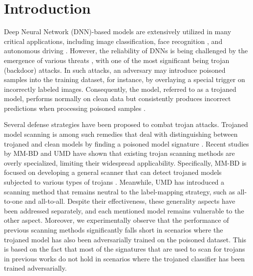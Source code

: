 \section{Introduction}
Deep Neural Network (DNN)-based models are extensively utilized in many critical applications, including image classification, face recognition \cite{face}, and autonomous driving \cite{cars}. However, the reliability of DNNs is being challenged by the emergence of various threats \cite{miller1981inverse}, with one of the most significant being trojan (backdoor) attacks. In such attacks, an adversary may introduce poisoned samples into the training dataset, for instance, by overlaying a special trigger on incorrectly labeled images. Consequently, the model, referred to as a trojaned model, performs normally on clean data but consistently produces incorrect predictions when processing poisoned samples \cite{badnets, wanet, bsurvey}.

Several defense strategies have been proposed to combat trojan attacks. Trojaned model scanning is among such remedies that deal with distinguishing between trojaned and clean models by finding a poisoned model signature \cite{NC,ABS,kARM,TABOR,Topo}. Recent studies by MM-BD \cite{MMBD} and UMD \cite{umd} have shown that existing trojan scanning methods are overly specialized, limiting their widespread applicability. Specifically, MM-BD is focused on developing a general scanner that can detect trojaned models subjected to various types of trojans \cite{blended, spec}. Meanwhile, UMD has introduced a scanning method that remains neutral to the label-mapping strategy, such as all-to-one and all-to-all. Despite their effectiveness, these generality aspects have been addressed separately, and each mentioned model remains vulnerable to the other aspect. Moreover, we experimentally observe that the performance of previous scanning methods significantly falls short in scenarios where the trojaned model has also been adversarially trained \cite{goodfellow2014explaining, pgd} on the poisoned dataset. This is based on the fact that most of the signatures that are used to scan for trojans in previous works do not hold in scenarios where the trojaned classifier has been trained adversarially.

